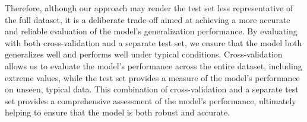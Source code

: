 Therefore, although our approach may render the test set less representative of the full dataset, it is a deliberate trade-off aimed at achieving a more accurate and reliable evaluation of the model's generalization performance.
By evaluating with both cross-validation and a separate test set, we ensure that the model both generalizes well and performs well under typical conditions.
Cross-validation allows us to evaluate the model's performance across the entire dataset, including extreme values, while the test set provides a measure of the model's performance on unseen, typical data.
This combination of cross-validation and a separate test set provides a comprehensive assessment of the model's performance, ultimately helping to ensure that the model is both robust and accurate.
